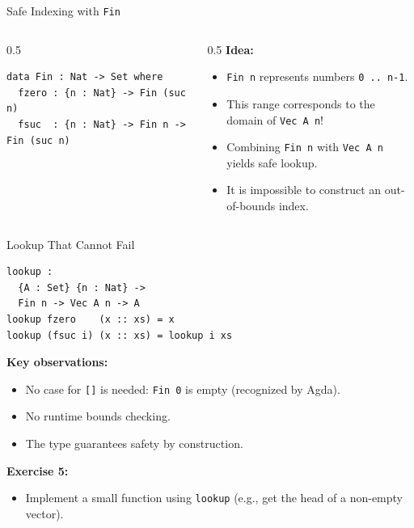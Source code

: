 \documentclass[aspectratio=169]{beamer}
\begin{document}
\begin{frame}[fragile]{Safe Indexing with \texttt{Fin}}
  \begin{columns}
    \begin{column}{0.5\textwidth}
\begin{lstlisting}
data Fin : Nat -> Set where
  fzero : {n : Nat} -> Fin (suc n)
  fsuc  : {n : Nat} -> Fin n -> Fin (suc n)
\end{lstlisting}
    \end{column}
    \begin{column}{0.5\textwidth}
      \textbf{Idea:}
      \begin{itemize}
        \item \texttt{Fin n} represents numbers \texttt{0 .. n-1}.
        \item This range corresponds to the domain of  \texttt{Vec A n}!
        \item Combining \texttt{Fin n} with \texttt{Vec A n} yields safe lookup.
        \item It is impossible to construct an out-of-bounds index. 
      \end{itemize}
    \end{column}
  \end{columns}
\end{frame}

\begin{frame}[fragile]{Lookup That Cannot Fail}
\begin{lstlisting}
lookup :
  {A : Set} {n : Nat} ->
  Fin n -> Vec A n -> A
lookup fzero    (x :: xs) = x
lookup (fsuc i) (x :: xs) = lookup i xs
\end{lstlisting}

  \textbf{Key observations:}
  \begin{itemize}
    \item No case for \texttt{[]} is needed: \texttt{Fin 0} is empty
      (recognized by Agda).
    \item No runtime bounds checking.
    \item The type guarantees safety by construction.
  \end{itemize}

  \vfill
  \textbf{Exercise 5:}
  \begin{itemize}
    \item Implement a small function using \texttt{lookup}
          (e.g., get the head of a non-empty vector).
  \end{itemize}
\end{frame}
\end{document}

